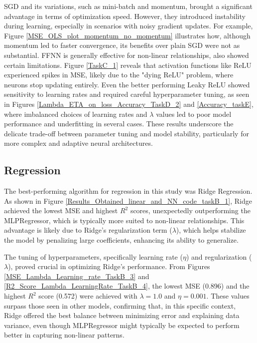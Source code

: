 \documentclass{article}
\newcommand{\0}{\mathbf{0}}
\newcommand{\1}{\mathbf{1}}
\begin{document}
SGD and its variations, such as mini-batch and momentum, brought a significant advantage in terms of optimization speed. However, they introduced instability during learning, especially in scenarios with noisy gradient updates. For example, Figure \ref{MSE_OLS_plot_momentum_no_momentum} illustrates how, although momentum led to faster convergence, its benefits over plain SGD were not as substantial. FFNN is generally effective for non-linear relationships, also showed certain limitations. Figure \ref{TaskC_1} reveals that activation functions like ReLU experienced spikes in MSE, likely due to the "dying ReLU" problem, where neurons stop updating entirely. Even the better performing Leaky ReLU showed sensitivity to learning rates and required careful hyperparameter tuning, as seen in Figures \ref{Lambda_ETA_on_loss_Accuracy_TaskD_2} and \ref{Accuracy_taskE}, where imbalanced choices of learning rates and \(\lambda\) values led to poor model performance and underfitting in several cases. These results underscore the delicate trade-off between parameter tuning and model stability, particularly for more complex and adaptive neural architectures.

\subsection{Regression}

The best-performing algorithm for regression in this study was Ridge Regression. As shown in Figure \ref{Results_Obtained_linear_and_NN_code_taskB_1}, Ridge achieved the lowest MSE and highest \( R^2 \) scores, unexpectedly outperforming the MLPRegressor, which is typically more suited to non-linear relationships. This advantage is likely due to Ridge’s regularization term (\(\lambda\)), which helps stabilize the model by penalizing large coefficients, enhancing its ability to generalize.

The tuning of hyperparameters, specifically learning rate (\(\eta\)) and regularization (\(\lambda\)), proved crucial in optimizing Ridge's performance. From Figures \ref{MSE_Lambda_Learning_rate_TaskB_3} and \ref{R2_Score_Lambda_LearningRate_TaskB_4}, the lowest MSE (0.896) and the highest \( R^2 \) score (0.572) were achieved with \(\lambda = 1.0\) and \(\eta = 0.001\). These values surpass those seen in other models, confirming that, in this specific context, Ridge offered the best balance between minimizing error and explaining data variance, even though MLPRegressor might typically be expected to perform better in capturing non-linear patterns.
\end{document}
